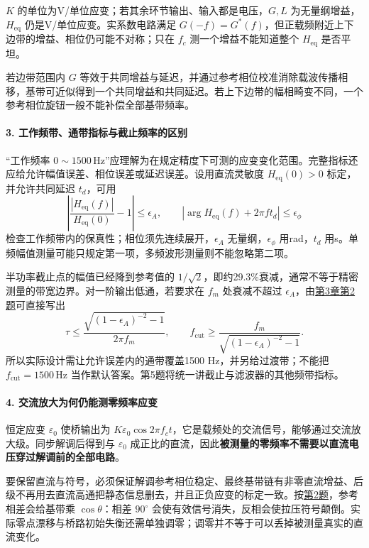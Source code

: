$K$ 的单位为V/单位应变；若其余环节输出、输入都是电压，$G,L$ 为无量纲增益，$H_{\mathrm{eq}}$ 仍是V/单位应变。实系数电路满足 $G(-f)=G^*(f)$，但正载频附近上下边带的增益、相位仍可能不对称；只在 $f_c$ 测一个增益不能知道整个 $H_{\mathrm{eq}}$ 是否平坦。

若边带范围内 $G$ 等效于共同增益与延迟，并通过参考相位校准消除载波传播相移，基带可近似得到一个共同增益和共同延迟。若上下边带的幅相畸变不同，一个参考相位旋钮一般不能补偿全部基带频率。

\paragraph{3. 工作频带、通带指标与截止频率的区别}
“工作频率 $0\sim1500\,\mathrm{Hz}$”应理解为在规定精度下可测的应变变化范围。完整指标还应给允许幅值误差、相位误差或延迟误差。设用直流灵敏度 $H_{\mathrm{eq}}(0)>0$ 标定，并允许共同延迟 $t_d$，可用
\[
\left|\frac{|H_{\mathrm{eq}}(f)|}{H_{\mathrm{eq}}(0)}-1\right|
\leq\epsilon_A,\qquad
\left|\arg H_{\mathrm{eq}}(f)+2\pi ft_d\right|
\leq\epsilon_\phi
\]
检查工作频带内的保真性；相位须先连续展开，$\epsilon_A$ 无量纲，$\epsilon_\phi$ 用rad，$t_d$ 用s。单频幅值测量可能只规定第一项，多频波形测量则不能忽略第二项。

半功率截止点的幅值已经降到参考值的 $1/\sqrt2$，即约29.3\%衰减，通常不等于精密测量的带宽边界。对一阶输出低通，若要求在 $f_m$ 处衰减不超过 $\epsilon_A$，由\hyperref[kn:3-2]{第3章第2题}可直接写出
\[
\tau\leq
\frac{\sqrt{(1-\epsilon_A)^{-2}-1}}{2\pi f_m},
\qquad
f_{\mathrm{cut}}\geq
\frac{f_m}{\sqrt{(1-\epsilon_A)^{-2}-1}}.
\]
所以实际设计需让允许误差内的通带覆盖1500 Hz，并另给过渡带；不能把 $f_{\mathrm{cut}}=1500\,\mathrm{Hz}$ 当作默认答案。第5题将统一讲截止与滤波器的其他频带指标。

\paragraph{4. 交流放大为何仍能测零频率应变}
恒定应变 $\varepsilon_0$ 使桥输出为 $K\varepsilon_0\cos2\pi f_ct$，它是载频处的交流信号，能够通过交流放大级。同步解调后得到与 $\varepsilon_0$ 成正比的直流，因此\textbf{被测量的零频率不需要以直流电压穿过解调前的全部电路}。

要保留直流与符号，必须保证解调参考相位稳定、最终基带链有非零直流增益、后级不再用去直流高通把静态信息删去，并且正负应变的标定一致。按\hyperref[kn:5-2]{第2题}，参考相差会给基带乘 $\cos\theta$：相差 $90^\circ$ 会使有效信号消失，反相会使拉压符号颠倒。实际零点漂移与桥路初始失衡还需单独调零；调零并不等于可以丢掉被测量真实的直流变化。

